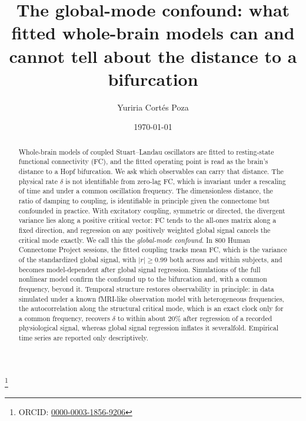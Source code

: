 \documentclass[aip,cha,reprint,amsmath,amssymb]{revtex4-2}
\theoremstyle{remark}
\begin{document}
\title{The global-mode confound: what fitted whole-brain models can and cannot tell about the distance to a bifurcation}

\author{Yuriria Cort\'es Poza}
\thanks{ORCID: \href{https://orcid.org/0000-0003-1856-9206}{0000-0003-1856-9206}}

\date{\today}

\begin{abstract}
Whole-brain models of coupled Stuart--Landau oscillators are fitted to resting-state functional connectivity (FC), and the fitted operating point is read as the brain's distance to a Hopf bifurcation. We ask which observables can carry that distance. The physical rate $\delta$ is not identifiable from zero-lag FC, which is invariant under a rescaling of time and under a common oscillation frequency. The dimensionless distance, the ratio of damping to coupling, is identifiable in principle given the connectome but confounded in practice. With excitatory coupling, symmetric or directed, the divergent variance lies along a positive critical vector: FC tends to the all-ones matrix along a fixed direction, and regression on any positively weighted global signal cancels the critical mode exactly. We call this the \emph{global-mode confound}. In 800 Human Connectome Project sessions, the fitted coupling tracks mean FC, which is the variance of the standardized global signal, with $|r|\ge0.99$ both across and within subjects, and becomes model-dependent after global signal regression. Simulations of the full nonlinear model confirm the confound up to the bifurcation and, with a common frequency, beyond it. Temporal structure restores observability in principle: in data simulated under a known fMRI-like observation model with heterogeneous frequencies, the autocorrelation along the structural critical mode, which is an exact clock only for a common frequency, recovers $\delta$ to within about 20\% after regression of a recorded physiological signal, whereas global signal regression inflates it severalfold. Empirical time series are reported only descriptively.
\end{abstract}

\maketitle
\end{document}
